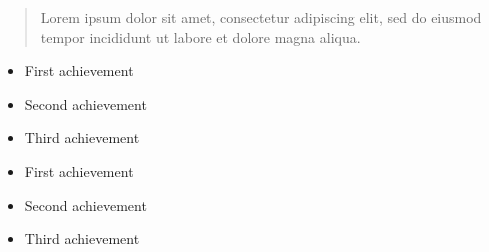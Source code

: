 \documentclass[10pt,a4paper,ragged2e,withhyper]{altacv}
\begin{document}
\begin{paracol}{2}
            \divider

        
        
        
        \newpage
        
        \switchcolumn
        
            \begin{quote}
                Lorem ipsum dolor sit amet, consectetur adipiscing elit, sed do eiusmod tempor incididunt ut labore et dolore magna aliqua.
            \end{quote}
        
            \begin{itemize}
                \item First achievement
                \item Second achievement
                \item Third achievement
            \end{itemize}
            \divider
            
            \begin{itemize}
                \item First achievement
                \item Second achievement
                \item Third achievement
            \end{itemize}


\end{paracol}
\end{document}
